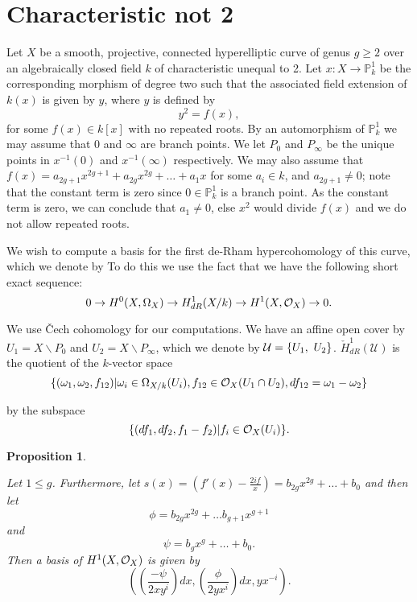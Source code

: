 \documentclass[draft, 11pt]{article} %
\title{}
\author{}
\theoremstyle{plain}
\newtheorem{prop}[defn]{Proposition}
\theoremstyle{remark}
\newcommand{\cO}{{\cal O}}
\newcommand{\ra}{\rightarrow}
\newcommand{\cU}{{\mathcal U}}
\begin{document}
\maketitle

\section{Characteristic not 2}


Let $X$ be a smooth, projective, connected hyperelliptic curve of genus $g \geq 2$ over an algebraically closed field $k$ of characteristic unequal to 2.
Let $x:X\rightarrow \mathbb P_k^1$ be the corresponding morphism of degree two such that the associated field extension of $k(x)$ is given by $y$, where $y$ is defined by
\[
y^2 = f(x),
\]
for some $f(x)\in k[x]$ with no repeated roots.
By an automorphism of $\mathbb P_k^1$ we may assume that $0$ and $\infty$ are branch points.
We let $P_0$ and $P_\infty$ be the unique points in $x^{-1}(0)$ and $x^{-1}(\infty)$ respectively.
We may also assume that $f(x) = a_{2g+1}x^{2g+1} + a_{2g}x^{2g} + \ldots + a_1x$ for some $a_i \in k$, and $a_{2g+1} \neq 0$; note that the constant term is zero since $0\in \mathbb P_k^1$ is a branch point.
As the constant term is zero, we can conclude that $a_1 \neq 0$, else $x^2$ would divide $f(x)$ and we do not allow repeated roots.

We wish to compute a basis for the first de-Rham hypercohomology of this curve, which we denote by  
To do this we use the fact that we have the following short exact sequence:
\begin{equation}\label{ses}
0 \ra H^0(X,\Omega_X) \ra H^1_{dR}(X/k) \ra H^1(X,\cO_X) \ra 0.
\end{equation}

We use \v{C}ech cohomology for our computations.
We have an affine open cover by $U_1 = X\backslash P_0$ and $U_2 = X \backslash P_\infty$, which we denote by ${\cal U} = \{ U_1, \ U_2\}$.
  $\check{H}_{dR}^1(\cU)$ is the quotient of the $k$-vector space 
\[
\{(\omega_1, \omega_2, f_{12}) | \omega_i\in \Omega_{X/k}(U_i), f_{12}\in \cO_X(U_1 \cap U_2), df_{12} = \omega_1 - \omega_2\}
\]

by the subspace
\[
\{ (df_1, df_2, f_1-f_2)|f_i \in \cO_X(U_i)\}.
\]

\begin{prop}\label{basish1char0}

Let $1 \leq g$.
Furthermore, let $s(x) = \left( f'(x) - \frac{2if}{x}\right) = b_{2g}x^{2g} + \ldots + b_0$ and then let 
\[
\phi = b_{2g} x^{2g} + \ldots b_{g+1}x^{g+1}
\]
and
\[ 
\psi = b_gx^g + \ldots + b_0.
\]
Then a basis of $H^1(X, \cO_X)$ is given by
\[
\left( \left(\frac{-\psi}{2xy^i}\right) dx, \left( \frac{\phi}{2yx^i} \right) dx, yx^{-i} \right).
\]

\end{prop}
\end{document}
